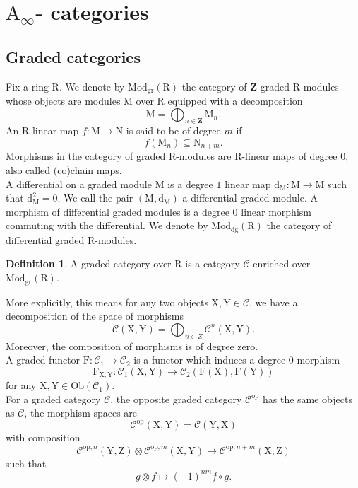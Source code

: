 \documentclass{article}
\theoremstyle{plain}
\theoremstyle{definition}
\newtheorem{definition}[theorem]{Definition}
\theoremstyle{remark}
\newcommand{\mr}{\mathrm}
\newcommand{\Aa}{\mr{A}_{\infty}}
\newcommand{\Z}{\mathbf Z}
\newcommand{\3}{\vspace{3mm}}
\newcommand{\2}{\vspace{2mm}}
\newcommand{\1}{\vspace{1mm}}
\begin{document}
\section{\texorpdfstring{ $\Aa$-}- categories}\label{sec1}

\subsection{Graded categories}

Fix a ring $\mr{R}$. We denote by $\mr{Mod}_{\mr{gr}}(\mr R)$ the category of $\Z$-graded $\mr{R}$-modules whose objects are modules $\mr{M}$ over $\mr{R}$ equipped with a decomposition $$\mr{M}=\bigoplus_{n \in \Z} \mr{M}_n.$$ An $\mr{R}$-linear map $f:\mr{M} \to \mr{N}$ is said to be of degree $m$ if $$f(\mr{M}_n) \subseteq \mr{N}_{n+m}.$$ Morphisms in the category of graded $\mr{R}$-modules are $\mr{R}$-linear maps of degree $0$, also called (co)chain maps.\\
A differential on a graded module $\mr{M}$ is a degree $1$ linear map $\mr{d}_\mr{M}:\mr{M}\to \mr{M}$ such that $\mr{d}_\mr{M}^2=0$. We call the pair $(\mr{M},\mr{d}_\mr{M})$ a differential graded module. A morphism of differential graded modules is a degree $0$ linear morphism commuting with the differential. We denote by $\mr{Mod}_\mr{dg}(\mr{R})$ the category of differential graded $\mr{R}$-modules.
\2
\begin{definition}
A graded category over $\mr{R}$ is a category $\mathcal{C}$ enriched over $\mr{Mod}_{\mr{gr}}(\mr{R})$.
\end{definition}
More explicitly, this means for any two objects $\mr{X,Y} \in \mathcal{C}$, we have a decomposition of the space of morphisms $$\mathcal{C}(\mr{X},\mr{Y}) = \bigoplus_{n \in Z}\mathcal{C}^{n}(\mr{X},\mr{Y}).$$
Moreover, the composition of morphisms is of degree zero.\\
A graded functor $\mr{F}:\mathcal{C}_1\to \mathcal{C}_2$ is a functor which induces a degree $0$ morphism $$\mr{F}_{\mr{X},\mr{Y}}:\mathcal{C}_1(\mr{X},\mr{Y})\to \mathcal{C}_2(\mr{F}(\mr{X}),\mr{F}(\mr{Y}))$$ for any $\mr{X},\mr{Y} \in \mr{Ob}(\mathcal{C}_1)$.\\
For a graded category $\mathcal{C}$, the opposite graded category $\mathcal{C}^{\mr{op}}$ has the same objects as $\mathcal{C}$, the morphism spaces are $$\mathcal{C}^{\mr{op}}(\mr{X,Y})=\mathcal{C}(\mr{Y,X})$$ with composition $$\mathcal{C}^{\mr{op},n}(\mr{Y,Z})\otimes \mathcal{C}^{\mr{op},m}(\mr{X,Y})\to \mathcal{C}^{\mr{op},n+m}(\mr{X,Z})$$ such that $$g\otimes f \mapsto (-1)^{nm}f\circ g.$$
\end{document}
